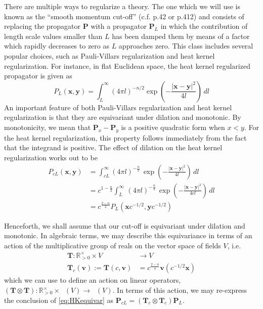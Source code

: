 \documentclass[12pt]{article}
\theoremstyle{definition}
\theoremstyle{plain}
\newcommand{\Symp}{\mathop{\mathrm{Sym}_2^+}}
\begin{document}
There are multiple ways to regularize a theory.  The one which we will use is known as the ``smooth momentum cut-off'' (c.f. \cite{costello2011renormalization} p.42 or \cite{huang2010quantum} p.412) and consists of replacing the propagator \(\mathbf{P}\) with a propagator \(\mathbf{P}_{L}\) in which the contribution of length scale values smaller than \(L\) has been damped them by means of a factor which rapidly decreases to zero as \(L\) approaches zero. 
This class includes several popular choices, such as Pauli-Villars regularization and heat kernel regularization.  For instance, in flat Euclidean space, the heat kernel regularized propagator is given as
\begin{equation}
  P_{L} (\mathbf{x}, \mathbf{y})
  = \int_{L}^{\infty}  (4 \pi l)^{-n/2}
  \exp\left(- \frac{|\mathbf{x} - \mathbf{y}|^2}{4l} \right) \, dl
\end{equation}
An important feature of both Pauli-Villars regularization and heat kernel regularization is that they are equivariant under dilation and monotonic.  By monotonicity, we mean that \(\mathbf{P}_{x} - \mathbf{P}_{y}\) is a positive quadratic form when \(x < y\).  For the heat kernel regularization, this property follows immediately from the fact that the integrand is positive.  The effect of dilation on the heat kernel regularization works out to be
\begin{align}
   P_{c L} (\mathbf{x}, \mathbf{y})
   &= \int_{c L}^{\infty}  (4 \pi l)^{-\tfrac{n}{2}} \,
  \exp\left(- \frac{|\mathbf{x} - \mathbf{y}|^2}{4l} \right) \, dl \\
  &= c^{1-\tfrac{n}{2}} \int_{L}^{\infty} \,
  (4 \pi l)^{-\tfrac{n}{2}} \,\exp\left(- \frac{|\mathbf{x}
      - \mathbf{y}|^2}{4c l} \right) \, dl \\
    &= c^{\tfrac{2-n}{2}} P_{L} (\mathbf{x}c^{-1/2}, \mathbf{y}c^{-1/2})\label{eq:HKequivar}
\end{align}

Henceforth, we shall assume that our cut-off is equivariant under dilation and monotonic.  In algebraic terms, we may describe this equivariance in terms of an action of the multiplicative group of reals on the vector space of fields $V$, i.e. 
\begin{align}
    \mathbf{T}:\mathbb{R}^\times_{>0} \times V &\to V\\
    \mathbf{T}_c(\mathbf{v}) := \mathbf{T}(c,\mathbf{v}) &= c^\frac{2-n}{4}\mathbf{v}(c^{-1/2}\mathbf{x})
\end{align}
which we can use to define an action on linear operators, \((\mathbf{T}\otimes\mathbf{T}) \colon \mathbb{R}^{\times}_{>0} \times \Symp (V) \to  \Symp (V)\).  In terms of this action, we may re-express the conclusion of \autoref{eq:HKequivar} as \(\mathbf{P}_{c L} = (\mathbf{T}_{c}\otimes \mathbf{T}_c) \mathbf{P}_{L}\).  
\end{document}
